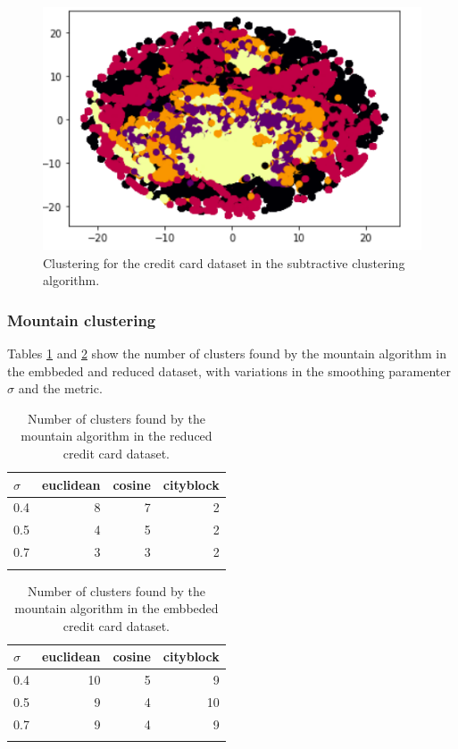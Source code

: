     \begin{figure}[ht!]
        \centering
        \includegraphics[scale = 0.4]{figures/credit/credit_s.png}
        \caption{Clustering for the credit card dataset in the subtractive clustering algorithm.}
        \label{fig:credit_s}
    \end{figure}
\subsubsection{Mountain clustering} Tables \ref{tab:c2_n_m} and \ref{tab:ce_n_m} show the number of clusters found by the mountain algorithm in the embbeded and reduced dataset, with variations in the smoothing paramenter $\sigma$ and the metric.

\begin{table}[ht!]
    \centering
   \begin{tabular}{lrrr}
    \toprule
    $\sigma$ &  euclidean &  cosine &  cityblock \\
    \midrule
    0.4 &          8 &       7 &          2 \\
    0.5 &          4 &       5 &          2 \\
    0.7 &          3 &       3 &          2 \\
    \bottomrule \\
    \end{tabular}
    \caption{Number of clusters found by the mountain algorithm in the reduced credit card dataset.}
    \label{tab:c2_n_m}
\end{table}

\begin{table}[ht!]
    \centering
    \begin{tabular}{lrrr}
    \toprule
    $\sigma$ &  euclidean &  cosine &  cityblock \\
    \midrule
    0.4 &         10 &       5 &          9 \\
    0.5 &          9 &       4 &         10 \\
    0.7 &          9 &       4 &          9 \\
    \bottomrule \\
    \end{tabular}
    \caption{Number of clusters found by the mountain algorithm in the embbeded credit card dataset.}
    \label{tab:ce_n_m}
\end{table}

